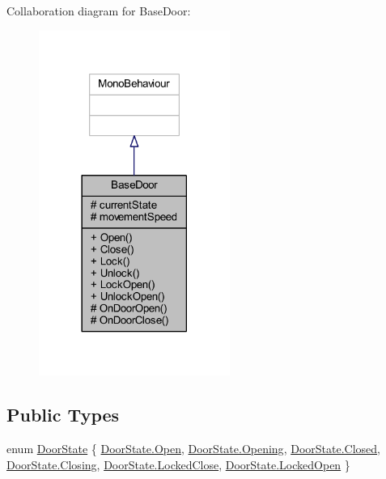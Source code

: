 Collaboration diagram for Base\+Door\+:\nopagebreak
\begin{figure}[H]
\begin{center}
\leavevmode
\includegraphics[width=177pt]{class_base_door__coll__graph}
\end{center}
\end{figure}
\subsection*{Public Types}
\begin{DoxyCompactItemize}
\item 
enum \mbox{\hyperlink{class_base_door_a22e038571daf23b362eb8aaedc78cb43}{Door\+State}} \{ \newline
\mbox{\hyperlink{class_base_door_a22e038571daf23b362eb8aaedc78cb43ac3bf447eabe632720a3aa1a7ce401274}{Door\+State.\+Open}}, 
\mbox{\hyperlink{class_base_door_a22e038571daf23b362eb8aaedc78cb43a9bd99a0beea48f10663fc4a7d7a33140}{Door\+State.\+Opening}}, 
\mbox{\hyperlink{class_base_door_a22e038571daf23b362eb8aaedc78cb43a03f4a47830f97377a35321051685071e}{Door\+State.\+Closed}}, 
\mbox{\hyperlink{class_base_door_a22e038571daf23b362eb8aaedc78cb43a5c8de6f894682fdb1786037b2040a26e}{Door\+State.\+Closing}}, 
\newline
\mbox{\hyperlink{class_base_door_a22e038571daf23b362eb8aaedc78cb43a79e87b5071e987722119d21ac38e9b0b}{Door\+State.\+Locked\+Close}}, 
\mbox{\hyperlink{class_base_door_a22e038571daf23b362eb8aaedc78cb43ac3c271ab63e95ff3d1b0e1eac01c9e90}{Door\+State.\+Locked\+Open}}
 \}
\end{DoxyCompactItemize}
